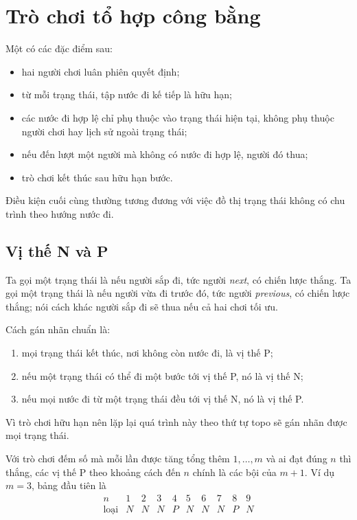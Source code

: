 \documentclass[11pt]{article}
\begin{document}
\section{Trò chơi tổ hợp công bằng}

Một  có các đặc điểm sau:
\begin{itemize}
  \item hai người chơi luân phiên quyết định;
  \item từ mỗi trạng thái, tập nước đi kế tiếp là hữu hạn;
  \item các nước đi hợp lệ chỉ phụ thuộc vào trạng thái hiện tại, không phụ
        thuộc người chơi hay lịch sử ngoài trạng thái;
  \item nếu đến lượt một người mà không có nước đi hợp lệ, người đó thua;
  \item trò chơi kết thúc sau hữu hạn bước.
\end{itemize}
Điều kiện cuối cùng thường tương đương với việc đồ thị trạng thái không có
chu trình theo hướng nước đi.

\subsection{Vị thế N và P}

Ta gọi một trạng thái là  nếu người sắp đi, tức người
\emph{next}, có chiến lược thắng. Ta gọi một trạng thái là 
nếu người vừa đi trước đó, tức người \emph{previous}, có chiến lược thắng;
nói cách khác người sắp đi sẽ thua nếu cả hai chơi tối ưu.

Cách gán nhãn chuẩn là:
\begin{enumerate}
  \item mọi trạng thái kết thúc, nơi không còn nước đi, là vị thế P;
  \item nếu một trạng thái có thể đi một bước tới vị thế P, nó là vị thế N;
  \item nếu mọi nước đi từ một trạng thái đều tới vị thế N, nó là vị thế P.
\end{enumerate}
Vì trò chơi hữu hạn nên lặp lại quá trình này theo thứ tự topo sẽ gán nhãn
được mọi trạng thái.

Với trò chơi đếm số mà mỗi lần được tăng tổng thêm \(1,\ldots,m\) và ai đạt
đúng \(n\) thì thắng, các vị thế P theo khoảng cách đến \(n\) chính là các bội
của \(m+1\). Ví dụ \(m=3\), bảng đầu tiên là
\[
\begin{array}{c|ccccccccc}
n&1&2&3&4&5&6&7&8&9\\
\hline
\text{loại}&N&N&N&P&N&N&N&P&N
\end{array}
\]
\end{document}
